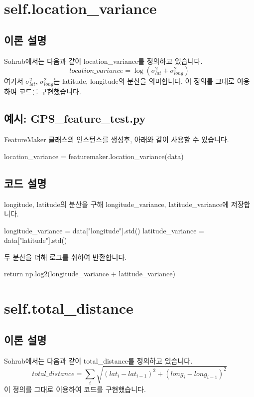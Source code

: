 \documentclass{oblivoir}
\begin{document}
  \section{self.location\_variance}
  \subsection{이론 설명}
  Sohrab\cite{Sohrab}에서는 다음과 같이 location\_variance를 정의하고 있습니다.
  \[location\_variance=\log(\sigma_{lat}^2+\sigma_{long}^2)\]
  여기서 $\sigma_{lat}^2$, $\sigma_{long}^2$는 latitude, longitude의 분산을 의미합니다.
  이 정의를 그대로 이용하여 코드를 구현했습니다.

  \subsection{예시: GPS\_feature\_test.py}
  FeatureMaker 클래스의 인스턴스를 생성후, 아래와 같이 사용할 수 있습니다.
  \begin{python}[label={GPS_feature_1}]
    location_variance = featuremaker.location_variance(data)
  \end{python}

  \subsection{코드 설명}
  longitude, latitude의 분산을 구해 longitude\_variance, latitude\_variance에 저장합니다.
  \begin{python}[label={GPS_feature_2}]
    longitude_variance = data["longitude"].std()
    latitude_variance = data["latitude"].std()
  \end{python}
  두 분산을 더해 로그를 취하여 반환합니다.
  \begin{python}[label={GPS_feature_3}]
    return np.log2(longitude_variance + latitude_variance)
  \end{python}

  \section{self.total\_distance}
  \subsection{이론 설명}
  Sohrab\cite{Sohrab}에서는 다음과 같이 total\_distance를 정의하고 있습니다.
  \[total\_distance=\sum_i{\sqrt{(lat_i-lat_{i-1})^2+(long_i-long_{i-1})^2}}\]
  이 정의를 그대로 이용하여 코드를 구현했습니다.
\end{document}
